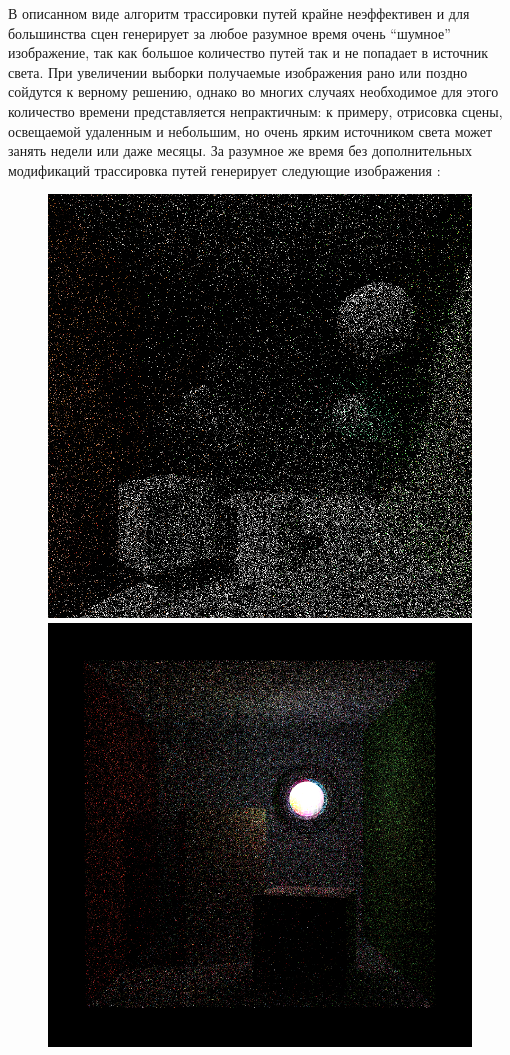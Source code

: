 \documentclass[12pt]{article}
\begin{document}
В описанном виде алгоритм трассировки путей крайне неэффективен и для большинства сцен генерирует за любое разумное время очень ``шумное'' изображение, так как большое количество путей так и не попадает в источник света. При увеличении выборки получаемые изображения рано или поздно сойдутся к верному решению, однако во многих случаях необходимое для этого количество времени представляется непрактичным: к примеру, отрисовка сцены, освещаемой удаленным и небольшим, но очень ярким источником света может занять недели или даже месяцы. За разумное же время без дополнительных модификаций трассировка путей генерирует следующие изображения \cite{karlIMP, karlBDPT}:
\begin{figure}[h]
\centering
\includegraphics[scale=0.3]{indirect5120.png}
\includegraphics[scale=0.3]{spherelight_16.png}

\end{figure}
\end{document}
